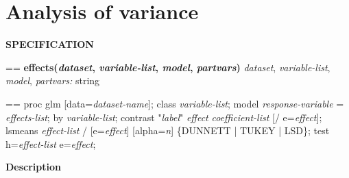 \documentclass{book}
\makeatletter
\newcommand\Texinfocommandstyletextvar[1]{{\normalfont{}\textsl{#1}}}%
\newenvironment{Texinfopreformatted}{%
  \par\GNUTobeylines\obeyspaces\frenchspacing\parskip=\z@\parindent=\z@}{}
{\catcode`\^^M=13 \gdef\GNUTobeylines{\catcode`\^^M=13 \def^^M{\null\par}}}
\newenvironment{Texinfoindented}{\begin{list}{}{}\item\relax}{\end{list}}
\renewcommand{\_}{\Texinfounderscore\discretionary{}{}{}}
\makeatother
\begin{document}
\section{{Analysis of variance}}
\label{anchor:Analysis-of-variance}%

\noindent{}\textbf{SPECIFICATION}
\begin{Texinfoindented}
\begin{Texinfopreformatted}%
\textbf{effects(\Texinfocommandstyletextvar{dataset}, \Texinfocommandstyletextvar{variable-list}, \Texinfocommandstyletextvar{model}, \Texinfocommandstyletextvar{partvars})}
\Texinfocommandstyletextvar{dataset}, \Texinfocommandstyletextvar{variable-list}, \Texinfocommandstyletextvar{model}, \Texinfocommandstyletextvar{partvars:} string
\end{Texinfopreformatted}
\end{Texinfoindented}

\begin{Texinfoindented}
\begin{Texinfopreformatted}%
proc glm [data=\Texinfocommandstyletextvar{dataset-name}];
class \Texinfocommandstyletextvar{variable-list};
model \Texinfocommandstyletextvar{response-variable} = \Texinfocommandstyletextvar{effects-list};
by \Texinfocommandstyletextvar{variable-list};
contrast "\Texinfocommandstyletextvar{label}" \Texinfocommandstyletextvar{effect} \Texinfocommandstyletextvar{coefficient-list} [/ e=\Texinfocommandstyletextvar{effect}];
lsmeans \Texinfocommandstyletextvar{effect-list} / [e=\Texinfocommandstyletextvar{effect}] [alpha=\Texinfocommandstyletextvar{n}] \{DUNNETT | TUKEY | LSD\};
test h=\Texinfocommandstyletextvar{effect-list} e=\Texinfocommandstyletextvar{effect};

\end{Texinfopreformatted}
\end{Texinfoindented}

%
%
%
%
%

\noindent{}\textbf{Description}
\end{document}
